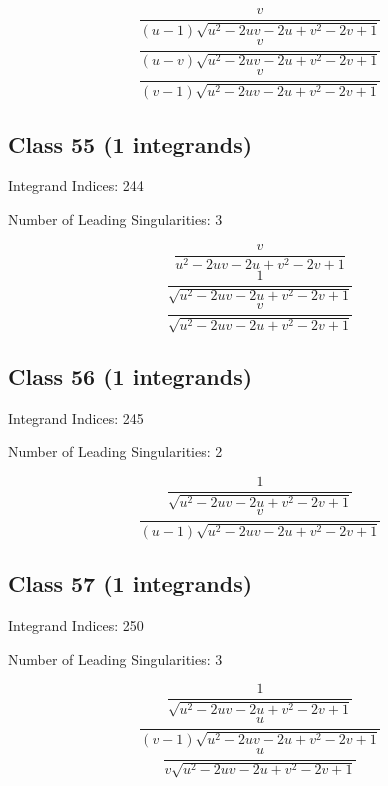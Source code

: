 \documentclass[11pt,a4paper]{article}
\begin{document}
\begin{equation}
\frac{v}{(u-1) \sqrt{u^2-2 u v-2 u+v^2-2 v+1}}
\end{equation}
\begin{equation}
\frac{v}{(u-v) \sqrt{u^2-2 u v-2 u+v^2-2 v+1}}
\end{equation}
\begin{equation}
\frac{v}{(v-1) \sqrt{u^2-2 u v-2 u+v^2-2 v+1}}
\end{equation}


\subsection*{Class 55 (1 integrands)}
Integrand Indices: 244

Number of Leading Singularities: 3

\begin{equation}
\frac{v}{u^2-2 u v-2 u+v^2-2 v+1}
\end{equation}
\begin{equation}
\frac{1}{\sqrt{u^2-2 u v-2 u+v^2-2 v+1}}
\end{equation}
\begin{equation}
\frac{v}{\sqrt{u^2-2 u v-2 u+v^2-2 v+1}}
\end{equation}


\subsection*{Class 56 (1 integrands)}
Integrand Indices: 245

Number of Leading Singularities: 2

\begin{equation}
\frac{1}{\sqrt{u^2-2 u v-2 u+v^2-2 v+1}}
\end{equation}
\begin{equation}
\frac{v}{(u-1) \sqrt{u^2-2 u v-2 u+v^2-2 v+1}}
\end{equation}


\subsection*{Class 57 (1 integrands)}
Integrand Indices: 250

Number of Leading Singularities: 3

\begin{equation}
\frac{1}{\sqrt{u^2-2 u v-2 u+v^2-2 v+1}}
\end{equation}
\begin{equation}
\frac{u}{(v-1) \sqrt{u^2-2 u v-2 u+v^2-2 v+1}}
\end{equation}
\begin{equation}
\frac{u}{v \sqrt{u^2-2 u v-2 u+v^2-2 v+1}}
\end{equation}
\end{document}
